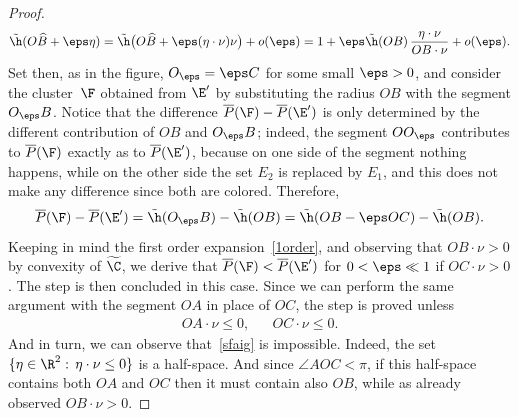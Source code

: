 \begin{proof}
\begin{equation}
\tilde \h(O\widehat B+\eps\eta)
=\tilde \h\big(O\widehat B + \eps (\eta\cdot\nu) \nu\big) + o(\eps)
=1+\eps \tilde\h(OB)\, \frac{\eta\cdot\nu}{OB\cdot \nu}+ o(\eps).
\end{equation}
Set then, as in the figure, $O_\eps=\eps C$ for some small $\eps>0$, and consider the cluster~$\F$ obtained from $\E'$ by substituting the radius $OB$ with the segment $O_\eps B$. Notice that the difference $\overline P(\F)-\overline P(\E')$ is only determined by the different contribution of $OB$ and $O_\eps B$; indeed, the segment $OO_\eps$ contributes to $\overline P(\F)$ exactly as to $\overline P(\E')$, because on one side of the segment nothing happens, while on the other side the set $E_2$ is replaced by $E_1$, and this does not make any difference since both are colored. Therefore,
\[
\overline P(\F)- \overline P(\E') = \tilde\h(O_\eps B) - \tilde\h(OB) = \tilde\h(OB -\eps OC) - \tilde\h(OB).
\]
Keeping in mind the first order expansion~\eqref{1order}, and observing that $OB\cdot \nu>0$ by convexity of $\widetilde \C$, we derive that $\overline P(\F)<\overline P(\E')$ for $0<\eps\ll 1$ if $OC\cdot \nu>0$. The step is then concluded in this case. Since we can perform the same argument with the segment $OA$ in place of $OC$, the step is proved unless
\begin{align}\label{sfaig}
OA \cdot \nu\leq 0, && OC \cdot \nu\leq 0.
\end{align}
And in turn, we can observe that~\eqref{sfaig} is impossible. Indeed, the set $\{\eta\in\R^2:\, \eta\cdot \nu\leq 0\}$ is a half-space. And since $\angle AOC<\pi$, if this half-space contains both $OA$ and $OC$ then it must contain also $OB$, while as already observed $OB\cdot \nu>0$.


\end{proof}

